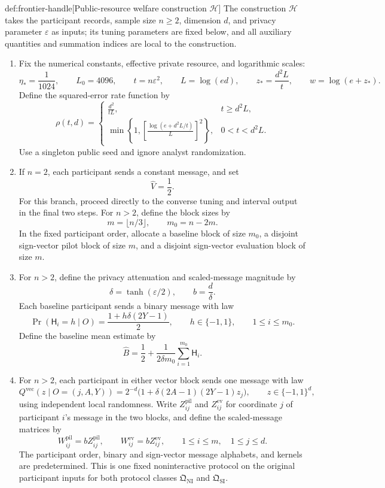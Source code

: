 \documentclass[11pt]{article}
\begin{document}
\begin{algorithmv}{def:frontier-handle}[Public-resource welfare construction $\mathscr H$]
The construction \(\mathscr H\) takes the participant records, sample size \(n\ge2\), dimension \(d\), and privacy parameter \(\varepsilon\) as inputs; its tuning parameters are fixed below, and all auxiliary quantities and summation indices are local to the construction.
\begin{enumerate}
\item Fix the numerical constants, effective private resource, and logarithmic scales:
\[
\eta_*=\frac1{1024},
\qquad L_0=4096,
\qquad t=n\varepsilon^2,
\qquad L=\log(ed),
\qquad z_*=\frac{d^2L}{t},
\qquad w=\log(e+z_*).
\]
Define the squared-error rate function by
\[
\rho(t,d)=
\begin{cases}
\displaystyle\frac{d^2}{tL},&t\ge d^2L,\\[3pt]
\displaystyle\min\left\{1,
\left[\frac{\log(e+d^2L/t)}{L}\right]^2\right\},
&0<t<d^2L.
\end{cases}
\]
Use a singleton public seed and ignore analyst randomization.

\item If \(n=2\), each participant sends a constant message, and set
\[
\widehat V=\frac12.
\]
For this branch, proceed directly to the converse tuning and interval output in the final two steps. For \(n>2\), define the block sizes by
\[
m=\lfloor n/3\rfloor,
\qquad m_0=n-2m.
\]
In the fixed participant order, allocate a baseline block of size \(m_0\), a disjoint sign-vector pilot block of size \(m\), and a disjoint sign-vector evaluation block of size \(m\).

\item For \(n>2\), define the privacy attenuation and scaled-message magnitude by
\[
\delta=\tanh(\varepsilon/2),
\qquad b=\frac d\delta.
\]
Each baseline participant sends a binary message with law
\[
\Pr(\mathsf H_i=h\mid O)
=\frac{1+h\delta(2Y-1)}2,
\qquad h\in\{-1,1\},
\qquad 1\le i\le m_0.
\]
Define the baseline mean estimate by
\[
\widehat B
=\frac12+\frac1{2\delta m_0}
\sum_{i=1}^{m_0}\mathsf H_i.
\]

\item For \(n>2\), each participant in either vector block sends one message with law
\[
Q^{\mathrm{vec}}(z\mid O=(j,A,Y))
=
2^{-d}\bigl(1+\delta(2A-1)(2Y-1)z_j\bigr),
\qquad z\in\{-1,1\}^d,
\]
using independent local randomness. Write \(Z^{\mathrm{pil}}_{ij}\) and \(Z^{\mathrm{ev}}_{ij}\) for coordinate \(j\) of participant \(i\)'s message in the two blocks, and define the scaled-message matrices by
\[
W^{\mathrm{pil}}_{ij}=bZ^{\mathrm{pil}}_{ij},
\qquad
W^{\mathrm{ev}}_{ij}=bZ^{\mathrm{ev}}_{ij},
\qquad 1\le i\le m,\quad 1\le j\le d.
\]
The participant order, binary and sign-vector message alphabets, and kernels are predetermined. This is one fixed noninteractive protocol on the original participant inputs for both protocol classes \(\mathfrak Q_{\mathrm{NI}}\) and \(\mathfrak Q_{\mathrm{SI}}\).


\end{enumerate}
\end{algorithmv}
\end{document}
